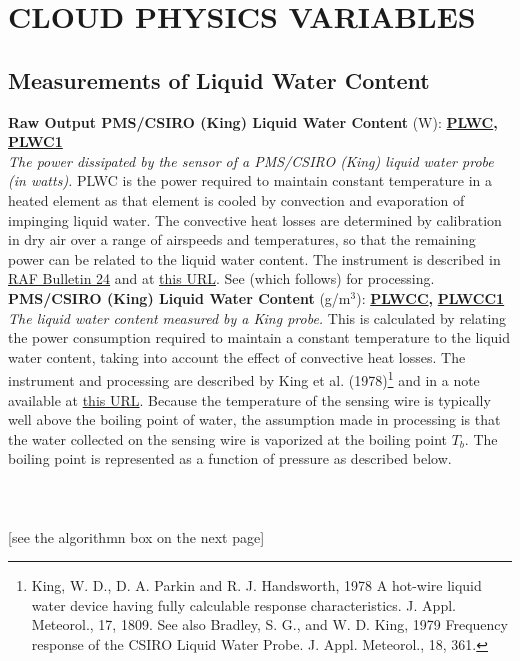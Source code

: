 
\section{CLOUD PHYSICS VARIABLES}

\subsection{Measurements of Liquid Water Content}
\begin{hangparagraphs}
\textbf{Raw Output PMS/CSIRO (King) Liquid Water Content} (W):\textbf{
}\textbf{\uline{PLWC}}\textbf{,
}\textbf{\uline{PLWC1}}\label{punch:5-3}\\
\emph{The power dissipated by the sensor of a PMS/CSIRO
(King) liquid water probe (in watts).
}PLWC is the power required to maintain constant temperature in a
heated element as that element is cooled by convection and evaporation
of impinging liquid water. The convective heat losses are determined
by calibration in dry air over a range of airspeeds and temperatures,
so that the remaining power can be related to the liquid water content.
The instrument is described in \href{http://www.eol.ucar.edu/raf/Bulletins/bulletin24.html}{RAF Bulletin 24}
and at \href{http://www.eol.ucar.edu/instruments/king-csiro-liquid-water-sensor}{this URL}.
See  (which follows) for processing.\\

\textbf{\label{PLWCC}PMS/CSIRO (King) Liquid Water Content} (g/m$^{3}$):\textbf{
}\textbf{\uline{PLWCC}}\textbf{,
}\textbf{\uline{PLWCC1}}\\
\emph{The liquid water content}
\emph{measured by a King probe.} This is calculated by relating the
power consumption required to maintain a constant temperature to the
liquid water content, taking into account the effect of convective
heat losses. The instrument and processing are described by King et
al. (1978)\footnote{King, W. D., D. A. Parkin and R. J. Handsworth, 1978 A hot-wire liquid
water device having fully calculable response characteristics. J.
Appl. Meteorol., 17, 1809. See also Bradley, S. G.,
and W. D. King, 1979 Frequency response of the CSIRO Liquid Water
Probe. J. Appl. Meteorol., 18, 361.} and in a note available at \href{https://www.eol.ucar.edu/system/files/PLWCCrev140214.pdf}{this URL}.
Because the temperature of the sensing wire is typically well above
the boiling point of water, the assumption
made in processing is that the water collected on the sensing wire
is vaporized at the boiling point $T_{b}$. The boiling point is represented
as a function of pressure as described below. \\
\\
\\
\\
{[}see the algorithmn box on the next page{]}\\
\vfill


\end{hangparagraphs}
